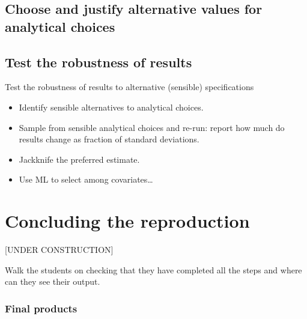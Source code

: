 \documentclass[]{book}
\providecommand{\tightlist}{%
  \setlength{\itemsep}{0pt}\setlength{\parskip}{0pt}}
\begin{document}
\hypertarget{test-rob}{%
\section{Choose and justify alternative values for analytical choices}\label{test-rob}}

\hypertarget{test-the-robustness-of-results}{%
\section{Test the robustness of results}\label{test-the-robustness-of-results}}

Test the robustness of results to alternative (sensible) specifications

\begin{itemize}
\tightlist
\item
  Identify sensible alternatives to analytical choices.
\item
  Sample from sensible analytical choices and re-run: report how much do results change as fraction of standard deviations.\\
\item
  Jackknife the preferred estimate.
\item
  Use ML to select among covariates\ldots{}
\end{itemize}

\hypertarget{concluding-the-reproduction}{%
\chapter{Concluding the reproduction}\label{concluding-the-reproduction}}

{[}UNDER CONSTRUCTION{]}

Walk the students on checking that they have completed all the steps and where can they see their output.

\hypertarget{final-products}{%
\subsection{Final products}\label{final-products}}
\end{document}
